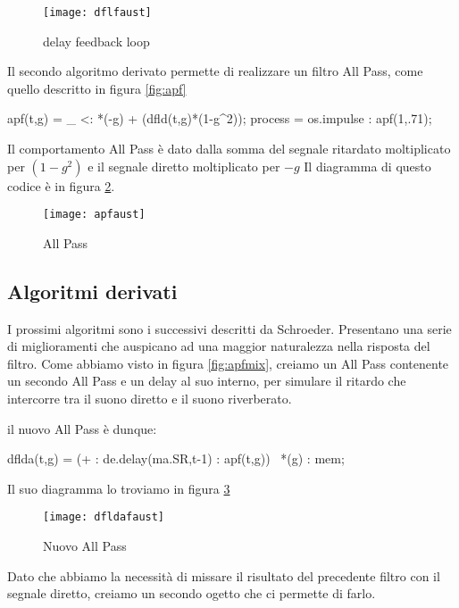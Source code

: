 \begin{figure}[htp]
\centering
\texttt{[image: dflfaust]}
\caption{delay feedback loop}
\label{fig:dflfaust}
\end{figure}

Il secondo algoritmo derivato permette di realizzare un filtro All Pass, come quello descritto in figura \ref{fig:apf}

\begin{code}
apf(t,g) = _ <: *(-g) + (dfld(t,g)*(1-g^2));
process = os.impulse : apf(1,.71);
\end{code}

Il comportamento All Pass è dato dalla somma del segnale ritardato moltiplicato per $(1-g^2)$ e il segnale diretto moltiplicato per $-g$
Il diagramma di questo codice è in figura \ref{fig:apfaust}.

\begin{figure}[htp]
\centering
\texttt{[image: apfaust]}
\caption{All Pass}
\label{fig:apfaust}
\end{figure}

\subsection{Algoritmi derivati}

I prossimi algoritmi sono i successivi descritti da Schroeder. Presentano una serie di miglioramenti che auspicano ad una maggior naturalezza nella risposta del filtro.
Come abbiamo visto in figura \ref{fig:apfmix}, creiamo un All Pass contenente un secondo All Pass e un delay al suo interno, per simulare il ritardo che intercorre tra il suono diretto e il suono riverberato.

\smallskip

il nuovo All Pass è dunque:
\begin{code}
dflda(t,g) =  (+ : de.delay(ma.SR,t-1) : apf(t,g))~ *(g) : mem;
\end{code}

Il suo diagramma lo troviamo in figura \ref{fig:dfldafaust}

\begin{figure}[htp]
\centering
\texttt{[image: dfldafaust]}
\caption{Nuovo All Pass}
\label{fig:dfldafaust}
\end{figure}

Dato che abbiamo la necessità di missare il risultato del precedente filtro con il segnale diretto, creiamo un secondo ogetto che ci permette di farlo.

